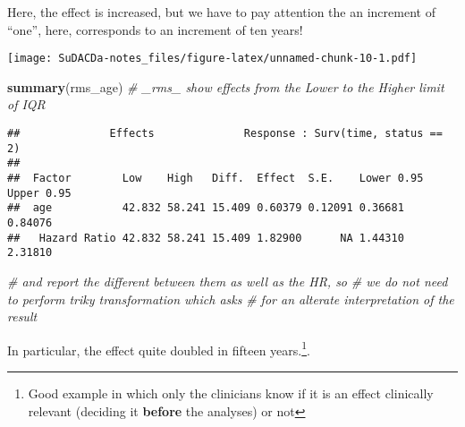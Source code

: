 \documentclass[]{book}
\newenvironment{Shaded}{\begin{snugshade}}{\end{snugshade}}
\newcommand{\KeywordTok}[1]{\textcolor[rgb]{0.13,0.29,0.53}{\textbf{{#1}}}}
\newcommand{\DataTypeTok}[1]{\textcolor[rgb]{0.13,0.29,0.53}{{#1}}}
\newcommand{\DecValTok}[1]{\textcolor[rgb]{0.00,0.00,0.81}{{#1}}}
\newcommand{\StringTok}[1]{\textcolor[rgb]{0.31,0.60,0.02}{{#1}}}
\newcommand{\CommentTok}[1]{\textcolor[rgb]{0.56,0.35,0.01}{\textit{{#1}}}}
\newcommand{\OtherTok}[1]{\textcolor[rgb]{0.56,0.35,0.01}{{#1}}}
\newcommand{\NormalTok}[1]{{#1}}
\let\rmarkdownfootnote\footnote%
\def\footnote{\protect\rmarkdownfootnote}
\theoremstyle{definition}
\theoremstyle{definition}
\theoremstyle{definition}
\theoremstyle{remark}
\begin{document}
Here, the effect is increased, but we have to pay attention the an
increment of ``one'', here, corresponds to an increment of ten years!

\begin{Shaded}
\end{Shaded}

\texttt{[image: SuDACDa-notes\_files/figure-latex/unnamed-chunk-10-1.pdf]}

\begin{Shaded}
\begin{Highlighting}[]
\KeywordTok{summary}\NormalTok{(rms_age)  }\CommentTok{# _rms_ show effects from the Lower to the Higher limit of IQR}
\end{Highlighting}
\end{Shaded}

\begin{verbatim}
##              Effects              Response : Surv(time, status == 2) 
## 
##  Factor        Low    High   Diff.  Effect  S.E.    Lower 0.95 Upper 0.95
##  age           42.832 58.241 15.409 0.60379 0.12091 0.36681    0.84076   
##   Hazard Ratio 42.832 58.241 15.409 1.82900      NA 1.44310    2.31810
\end{verbatim}

\begin{Shaded}
\begin{Highlighting}[]
                  \CommentTok{# and report the different between them as well as the HR, so}
                  \CommentTok{# we do not need to perform triky transformation which asks}
                  \CommentTok{# for an alterate interpretation of the result}
\end{Highlighting}
\end{Shaded}

In particular, the effect quite doubled in fifteen years.\footnote{Good
  example in which only the clinicians know if it is an effect
  clinically relevant (deciding it \textbf{before} the analyses) or not}.
\end{document}
